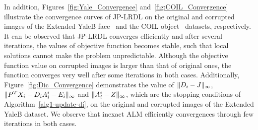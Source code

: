\documentclass[journal]{IEEEtran}
\DeclarePairedDelimiter\norm{\lVert}{\rVert}
\begin{document}
In addition, Figures~\ref{fig:Yale_Convergence} and~\ref{fig:COIL_Convergence} illustrate the convergence curves of JP-LRDL on the original and corrupted images of the Extended YaleB face~\cite{Yale} and the COIL object~\cite{COIL} datasets, respectively. It can be observed that JP-LRDL converges efficiently and after several iterations, the values of objective function becomes stable, such that local solutions cannot make the problem unpredictable. Although the objective function value on corrupted images is larger than that of original ones, the function converges very well after some iterations in both cases. Additionally, Figure~\ref{fig:Dic_Convergence} demonstrates the value of $\norm{D_i - J}_{\infty}$, $\norm{P^T X_i - D_i A_i^i - E_i}_{\infty}$ and $\norm{A_i^i - Z}_{\infty}$, which are the stopping conditions of Algorithm~\ref{alg1-update-di}, on the original and corrupted images of the Extended YaleB dataset. We observe that inexact ALM efficiently convergences through few iterations in both cases.
\end{document}
